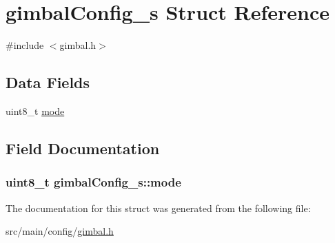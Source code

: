 \hypertarget{structgimbalConfig__s}{\section{gimbal\+Config\+\_\+s Struct Reference}
\label{structgimbalConfig__s}
}


{\ttfamily \#include $<$gimbal.\+h$>$}

\subsection*{Data Fields}
\begin{DoxyCompactItemize}
\item 
uint8\+\_\+t \hyperlink{structgimbalConfig__s_ab65fee9e2bc66fa09e0518fc5e6dd91a}{mode}
\end{DoxyCompactItemize}


\subsection{Field Documentation}
\hypertarget{structgimbalConfig__s_ab65fee9e2bc66fa09e0518fc5e6dd91a}{
\subsubsection[{mode}]{\setlength{\rightskip}{0pt plus 5cm}uint8\+\_\+t gimbal\+Config\+\_\+s\+::mode}}\label{structgimbalConfig__s_ab65fee9e2bc66fa09e0518fc5e6dd91a}


The documentation for this struct was generated from the following file\+:\begin{DoxyCompactItemize}
\item 
src/main/config/\hyperlink{gimbal_8h}{gimbal.\+h}\end{DoxyCompactItemize}
